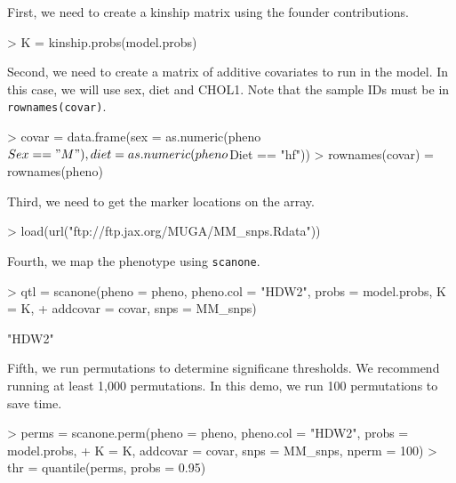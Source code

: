 \documentclass{article}
\begin{document}
\vspace{5 mm}

First, we need to create a kinship matrix using the founder contributions.

\begin{Schunk}
\begin{Sinput}
> K = kinship.probs(model.probs)
\end{Sinput}
\end{Schunk}

Second, we need to create a matrix of additive covariates to run in the model. In this case, we will use sex, diet and CHOL1. Note that the sample IDs must be in \texttt{rownames(covar)}.

\begin{Schunk}
\begin{Sinput}
> covar = data.frame(sex = as.numeric(pheno$Sex == "M"), diet = as.numeric(pheno$Diet == "hf"))
> rownames(covar) = rownames(pheno)
\end{Sinput}
\end{Schunk}

Third, we need to get the marker locations on the array.

\begin{Schunk}
\begin{Sinput}
> load(url("ftp://ftp.jax.org/MUGA/MM_snps.Rdata"))
\end{Sinput}
\end{Schunk}

Fourth, we map the phenotype using \texttt{scanone}.

\begin{Schunk}
\begin{Sinput}
> qtl = scanone(pheno = pheno, pheno.col = "HDW2", probs = model.probs, K = K,
+               addcovar = covar, snps = MM_snps)
\end{Sinput}
\begin{Soutput}
[1] "HDW2"
\end{Soutput}
\end{Schunk}

Fifth, we run permutations to determine significane thresholds. We recommend running at least 1,000 permutations. In this demo, we run 100 permutations to save time.

\begin{Schunk}
\begin{Sinput}
> perms = scanone.perm(pheno = pheno, pheno.col = "HDW2", probs = model.probs, 
+         K = K, addcovar = covar, snps = MM_snps, nperm = 100)
> thr = quantile(perms, probs = 0.95)
\end{Sinput}
\end{Schunk}
\end{document}

